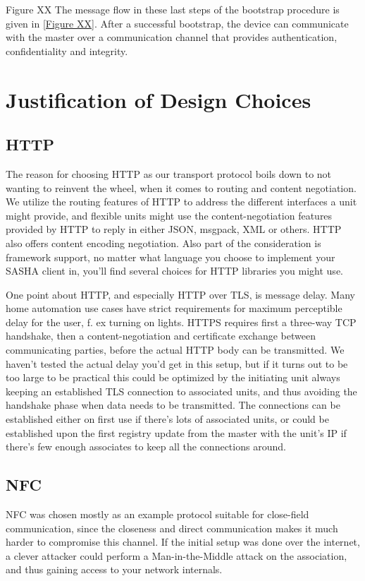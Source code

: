 Figure XX
The message flow in these last steps of the bootstrap procedure is given in \autoref{Figure XX}. After a successful bootstrap, the device can communicate with the master over a communication channel that provides authentication, confidentiality and integrity.
\section{Justification of Design Choices}

\subsection{HTTP}
The reason for choosing HTTP as our transport protocol boils down to not wanting to reinvent the wheel, when it comes to routing and content negotiation. We utilize the routing features of HTTP to address the different interfaces a unit might provide, and flexible units might use the content-negotiation features provided by HTTP to reply in either JSON, msgpack, XML or others. HTTP also offers content encoding negotiation. Also part of the consideration is framework support, no matter what language you choose to implement your SASHA client in, you’ll find several choices for HTTP libraries you might use.

One point about HTTP, and especially HTTP over TLS, is message delay. Many home automation use cases have strict requirements for maximum perceptible delay for the user, f. ex turning on lights. HTTPS requires first a three-way TCP handshake, then a content-negotiation and certificate exchange between communicating parties, before the actual HTTP body can be transmitted. We haven’t tested the actual delay you’d get in this setup, but if it turns out to be too large to be practical this could be optimized by the initiating unit always keeping an established TLS connection to associated units, and thus avoiding the handshake phase when data needs to be transmitted. The connections can be established either on first use if there’s lots of associated units, or could be established upon the first registry update from the master with the unit’s IP if there’s few enough associates to keep all the connections around.

\subsection{NFC}
NFC was chosen mostly as an example protocol suitable for close-field communication, since the closeness and direct communication makes it much harder to compromise this channel. If the initial setup was done over the internet, a clever attacker could perform a Man-in-the-Middle attack on the association, and thus gaining access to your network internals.

